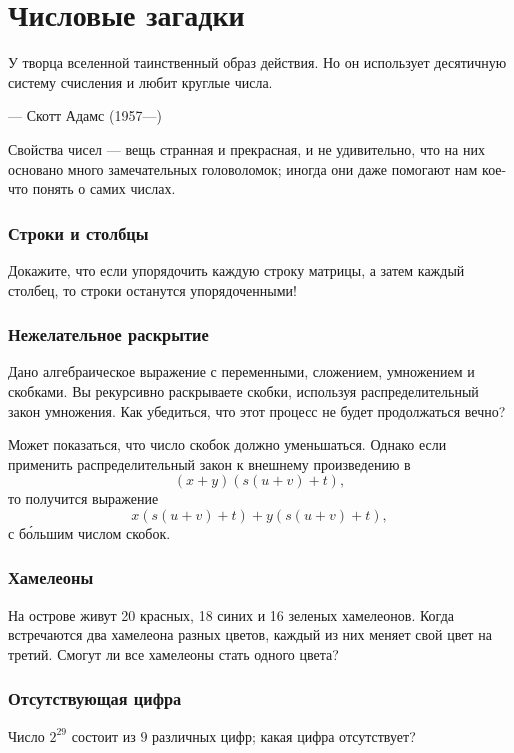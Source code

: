 \chapter{Числовые загадки}


\setlength{\epigraphwidth}{.85\textwidth}
\epigraph{У творца вселенной таинственный образ действия.
Но он использует десятичную систему счисления и любит круглые
числа.
}{--- Скотт Адамс (1957---)}


Свойства чисел --- вещь странная и прекрасная, и не удивительно, что на них основано много замечательных головоломок; иногда они даже помогают нам кое-что понять о самих числах.

\subsection*{Строки и столбцы}

Докажите, что если упорядочить каждую строку матрицы, а затем каждый столбец, то строки останутся упорядоченными!

\subsection*{Нежелательное раскрытие}

Дано алгебраическое выражение с переменными, сложением, умножением и скобками.
Вы рекурсивно раскрываете скобки, используя распределительный закон умножения.
Как убедиться, что этот процесс не будет продолжаться вечно?

Может показаться, что число скобок должно уменьшаться.
Однако если применить распределительный закон к внешнему произведению в
\[(x + y)(s(u + v) + t),\]
то получится выражение
\[x(s(u + v) + t) + y(s(u + v) + t),\]
с б\'{о}льшим числом скобок.

\subsection*{Хамелеоны}

На острове живут 20 красных, 18 синих и 16 зеленых хамелеонов.
Когда встречаются два хамелеона разных цветов, каждый из них меняет свой цвет на третий.
Смогут ли все хамелеоны стать одного цвета?

\subsection*{Отсутствующая цифра}

Число $2^{29}$ состоит из $9$ различных цифр; какая цифра отсутствует?

